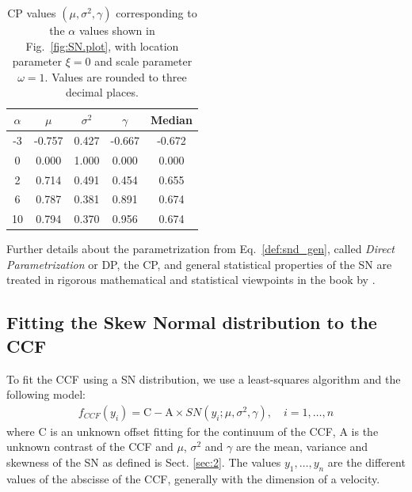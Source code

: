 \documentclass[11pt, oneside]{article}
\begin{document}
\begin{table}[htbp]
   \centering
   \begin{tabular}{|ccccc|} %
\hline
$\alpha$ & $\mu$ & $\sigma^2$ & $\gamma$  & Median \\
\hline
 -3 	&	 -0.757	&	 0.427	&	 -0.667  	& 	-0.672\\
0	&	 0.000 	&	1.000	&	 0.000 	& 	0.000\\
2	&	 0.714	&	 0.491	&	 0.454 	& 	0.655\\
6	&	 0.787	&	 0.381	&	 0.891 	& 	0.674\\
10	&	 0.794	&	 0.370	&	 0.956 	& 	0.674\\
\hline
   \end{tabular}
   \caption{CP values $(\mu, \sigma^2, \gamma)$ corresponding to the $\alpha$ values shown in Fig.~\ref{fig:SN.plot}, with location parameter $\xi = 0$ and scale parameter $\omega = 1$. Values are rounded to three decimal places.}
   \label{tab:cp_values}
\end{table}
%
Further details about the parametrization from Eq.~\ref{def:snd_gen}, called \emph{Direct Parametrization} or DP, the CP, and general statistical properties of the SN are treated in rigorous mathematical and statistical viewpoints in the book by \cite{Azzalini2014}.

\subsection{Fitting the Skew Normal distribution to the CCF} \label{sec:3}

To fit the CCF using a SN distribution, we use a least-squares algorithm and the following model:
%
\begin{eqnarray} \label{eq:3}
f_{CCF}(y_i) = \mathrm{C} - \mathrm{A} \times SN(y_i;\mu, \sigma^2, \gamma), \quad i = 1, \ldots, n
\end{eqnarray}
%
where C is an unknown offset fitting for the continuum of the CCF, A is the unknown contrast of the CCF and $\mu$, $\sigma^2$ and $\gamma$ are the mean, variance and skewness of the SN as defined is Sect. \ref{sec:2}.
The values $y_1, \ldots, y_n$ are the different values of the abscisse of the CCF, generally with the dimension of a velocity.
\end{document}
